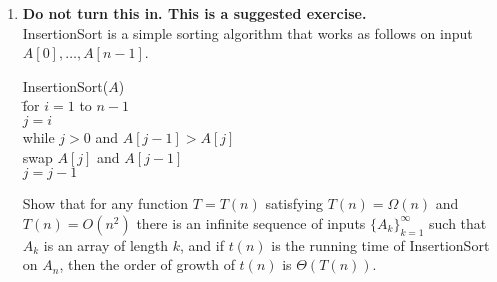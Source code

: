 \documentclass[11pt]{article}
\begin{document}
\begin{enumerate}
\item {\bf Do not turn this in.  This is a suggested exercise.}  \\
InsertionSort is a simple sorting algorithm that works as follows on input $A[0], \ldots, A[n-1]$.


\begin{tabbing}

InsertionSort($A$) \\
\quad\quad \= for $i=1$ to $n-1$\\       
           \> \quad $j=i$ \\ 
           \> \quad while $j > 0$ and $A[j-1] > A[j]$ \\ 
           \> \quad \quad swap $A[j]$ and $A[j-1]$ \\ 
           \> \quad \quad $j = j-1$\\
\end{tabbing}

Show that for any function $T = T(n)$ satisfying $T(n) = \Omega(n)$ and $T(n) = O(n^2)$ there is an
infinite sequence of inputs $\{A_k\}_{k=1}^\infty$ such that $A_k$ is an array of length $k$, and
if $t(n)$ is the running time of InsertionSort on $A_n$, then the order of growth of $t(n)$ is
$\Theta(T(n))$.  
\end{enumerate}
\end{document}
